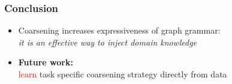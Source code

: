 \documentclass{beamer}
\newcommand{\red}[1]{\textcolor{red}{#1}}
\begin{document}
\begin{frame}
    \frametitle{Conclusion}
    
    \begin{itemize}
        \item Coarsening increases expressiveness of graph grammar: \\
        {\em it is an effective way to inject domain knowledge }
        \item {\bf Future work:} \\\red{learn} task specific coarsening strategy directly from data   
    \end{itemize}

\end{frame}
\end{document}
